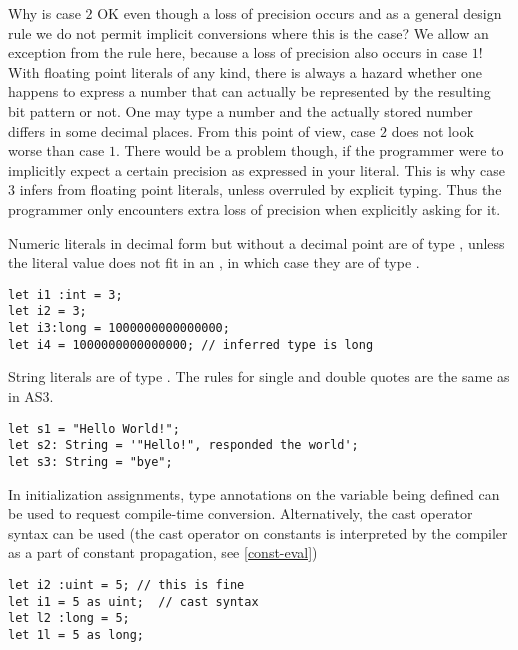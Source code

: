 Why is case $2$ OK even though a loss of precision occurs and as a general
design rule we do not permit implicit conversions where this is the case? We allow an
 exception from the rule here, because a loss of precision also occurs in case
 $1$! With floating point literals of any kind, there is always a hazard
 whether one happens to express a number that can actually be represented by the
 resulting bit pattern or not. One may type a number and the actually stored
 number differs in some decimal places. From this point of view, case $2$ does
 not look worse than case $1$. There would be a problem though, if the
 programmer were to implicitly expect a certain precision as expressed in your literal. This is why
 case $3$ infers  from floating point literals, unless overruled by
 explicit typing. Thus the programmer only encounters extra loss of precision
 when explicitly asking for it.

Numeric literals in decimal form but without a decimal point are of
type , unless the literal value does not fit in an , in
which case they are of type .
\begin{verbatim}
let i1 :int = 3;
let i2 = 3;
let i3:long = 1000000000000000;
let i4 = 1000000000000000; // inferred type is long
\end{verbatim}
String literals are of type . The rules for single and
double quotes are the same as in AS3.
\begin{verbatim}
let s1 = "Hello World!";
let s2: String = '"Hello!", responded the world';
let s3: String = "bye";
\end{verbatim}

In  initialization assignments, type annotations on the variable being defined can be used
to request compile-time conversion. Alternatively, the cast operator
syntax can be used (the cast operator on constants is interpreted by
the compiler as a part of constant propagation, see \ref{const-eval})
\begin{verbatim}
let i2 :uint = 5; // this is fine
let i1 = 5 as uint;  // cast syntax
let l2 :long = 5;
let 1l = 5 as long;
\end{verbatim}

